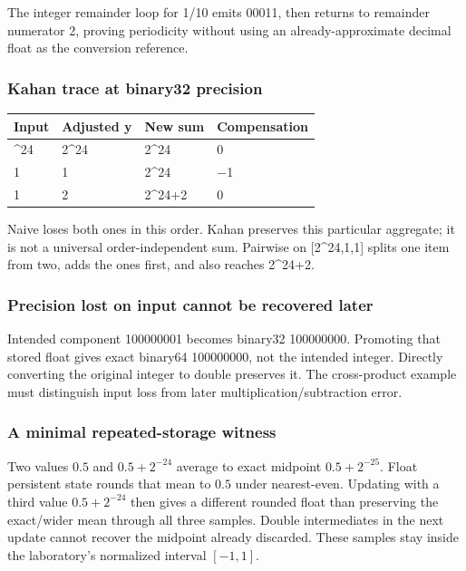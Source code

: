 The integer remainder loop for 1/10 emits 00011, then returns to remainder numerator 2, proving periodicity without using an already-approximate decimal float as the conversion reference.

\subsubsection{Kahan trace at binary32 precision}\label{appendix-92ff77d4dfdc-kahan-trace-at-binary32-precision}

{\def\LTcaptype{none} %
\begin{longtable}[]{@{}llll@{}}
\toprule\noalign{}
Input & Adjusted y & New sum & Compensation \\
\midrule\noalign{}
\endhead
\bottomrule\noalign{}
\endlastfoot
2\^{}24 & 2\^{}24 & 2\^{}24 & 0 \\
1 & 1 & 2\^{}24 & −1 \\
1 & 2 & 2\^{}24+2 & 0 \\
\end{longtable}
}

Naive loses both ones in this order. Kahan preserves this particular aggregate; it is not a universal order-independent sum. Pairwise on {[}2\^{}24,1,1{]} splits one item from two, adds the ones first, and also reaches 2\^{}24+2.

\subsubsection{Precision lost on input cannot be recovered later}\label{appendix-92ff77d4dfdc-precision-lost-on-input-cannot-be-recovered-later}

Intended component 100000001 becomes binary32 100000000. Promoting that stored float gives exact binary64 100000000, not the intended integer. Directly converting the original integer to double preserves it. The cross-product example must distinguish input loss from later multiplication/subtraction error.

\subsubsection{A minimal repeated-storage witness}\label{appendix-92ff77d4dfdc-a-minimal-repeated-storage-witness}

Two values \(0.5\) and \(0.5+2^{-24}\) average to exact midpoint \(0.5+2^{-25}\). Float persistent state rounds that mean to \(0.5\) under nearest-even. Updating with a third value \(0.5+2^{-24}\) then gives a different rounded float than preserving the exact/wider mean through all three samples. Double intermediates in the next update cannot recover the midpoint already discarded. These samples stay inside the laboratory's normalized interval \([-1,1]\).

